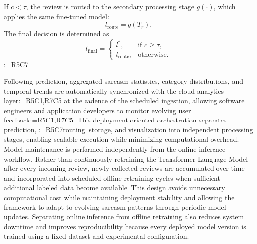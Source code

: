 \documentclass[a4paper,fleqn]{cas-sc}
\makeatletter
\newif\iftracked
\newcommand{\rv@setcolour}[1]{%
  \IfStrEq{#1}{R7C7}{\color{rvEdit}}{%
    \IfSubStr{#1}{R5}{\IfSubStr{#1}{R7}{\color{rvBoth}}{\color{rvFive}}}{\color{rvSeven}}}}
\newcommand{\rv@tag}[1]{\textsuperscript{\sffamily\bfseries\scriptsize[\StrSubstitute{#1}{,}{, }]}\,}
\newcommand{\rv@recordone}[1]{%
  \edef\rv@i{#1}%
  \ifcsdef{rv@n@\rv@i}{}{\csgdef{rv@n@\rv@i}{0}}%
  \csxdef{rv@n@\rv@i}{\the\numexpr\csuse{rv@n@\rv@i}+1\relax}%
  \begingroup\edef\@currentlabel{\rv@i}\label{rv:\rv@i:\csuse{rv@n@\rv@i}}\endgroup}
\newcommand{\rv@record}[1]{\@for\rv@id:=#1\do{\expandafter\rv@recordone\expandafter{\rv@id}}}
\DeclareRobustCommand{\rc}[2]{\rv@record{#1}\iftracked{\rv@setcolour{#1}\rv@tag{#1}#2}\else#2\fi}
\DeclareRobustCommand{\rcdel}[2]{\rv@record{#1}\iftracked{\rv@setcolour{#1}\rv@tag{#1}\rv@strike{#2}}\else\unskip\fi}
\DeclareRobustCommand{\rcrep}[3]{\rv@record{#1}\iftracked{\rv@setcolour{#1}\rv@tag{#1}\rv@strike{#2} #3}\else#3\fi}
\DeclareRobustCommand{\rcm}[2]{\iftracked{\rv@setcolour{#1}#2}\else#2\fi}
\DeclareRobustCommand{\rcnote}[2]{\rv@record{#1}\iftracked{\rv@setcolour{#1}\rv@tag{#1}\textit{[#2]}}\else\unskip\fi}
\makeatother
\begin{document}
If $c < \tau$, the review is routed to the secondary processing stage $g(\cdot)$, which applies the same fine-tuned model:
\begin{equation}
\rcm{R5C7}{l_{\mathrm{route}}} = g(T_r).
\label{eq:secondary}
\end{equation}
The final decision is determined as
\begin{equation}
l_{\mathrm{final}} =
\begin{cases}
l^{*}, & \text{if } c \geq \tau,\\
\rcm{R5C7}{l_{\mathrm{route}}}, & \text{otherwise.}
\end{cases}
\label{eq:final}
\end{equation}
\rcnote{R5C7}{In Equations (20) and (21) the symbol $l_{\mathrm{route}}$ replaces $l_{\mathrm{verify}}$ of the previous version, because the secondary stage re-applies the same model and does not verify the prediction.}

Following prediction, aggregated sarcasm statistics, category distributions, and temporal trends are automatically synchronized with the cloud analytics layer\rc{R5C1,R7C5}{ at the cadence of the scheduled ingestion}, allowing software engineers and application developers to monitor evolving user feedback\rcdel{R5C1,R7C5}{in near real time}. This deployment-oriented orchestration separates prediction, \rcrep{R5C7}{verification}{routing}, storage, and visualization into independent processing stages, enabling scalable execution while minimizing computational overhead. Model maintenance is performed independently from the online inference workflow. Rather than continuously retraining the Transformer Language Model after every incoming review, newly collected reviews are accumulated over time and incorporated into scheduled offline retraining cycles when sufficient additional labeled data become available. This design avoids unnecessary computational cost while maintaining deployment stability and allowing the framework to adapt to evolving sarcasm patterns through periodic model updates. Separating online inference from offline retraining also reduces system downtime and improves reproducibility because every deployed model version is trained using a fixed dataset and experimental configuration.
\end{document}
